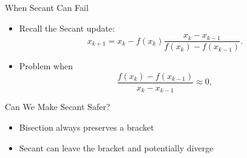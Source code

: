 \documentclass[10pt]{beamer}
\begin{document}

\begin{frame}{When Secant Can Fail}

\begin{center}
\end{center}

\begin{itemize}

    \item Recall the Secant update:
    \[
    x_{k+1}
    =
    x_k
    -
    f(x_k)
    \frac{x_k-x_{k-1}}
         {f(x_k)-f(x_{k-1})}.
    \]

    \item<2-> Problem when 
    \[
    \frac{f(x_k)-f(x_{k-1})}
         {x_k-x_{k-1}}
    \approx 0,
    \]

\end{itemize}
\end{frame}


\begin{frame}{Can We Make Secant Safer?}

\begin{center}
\end{center}

\begin{itemize}
    \item Bisection always preserves a bracket 

    \item<2-> Secant can leave the bracket and potentially diverge
\end{itemize}

\vfill



\end{frame}


\end{document}
